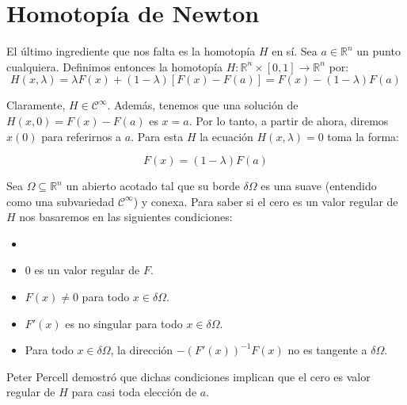 \section{Homotopía de Newton}
El último ingrediente que nos falta es la homotopía $H$ en sí. Sea $a\in\mathbb{R}^n$ un punto cualquiera. Definimos entonces la homotopía $H:\mathbb{R}^n\times [0,1] \to \mathbb{R}^n$ por:
\[ H(x,\lambda) = \lambda F(x) + (1- \lambda) [F(x)- F(a)] = F(x) - (1-\lambda) F(a) \]

Claramente, $H \in \mathcal{C}^\infty$. Además, tenemos que una solución de $H(x,0)=F(x)-F(a)$ es $x=a$. Por lo tanto, a partir de ahora, diremos $x(0)$ para referirnos a $a$.
Para esta $H$ la ecuación $H(x,\lambda)=0$ toma la forma:

\[ F(x) = (1 - \lambda) F(a) \]

Sea $\Omega \subseteq \mathbb{R}^n$ un abierto acotado tal que su borde $\delta \Omega$ es una suave (entendido como una subvariedad $\mathcal{C}^\infty$) y conexa.
Para saber si el cero es un valor regular de $H$ nos basaremos en las siguientes condiciones:

\begin{definition}
	\begin{itemize}
		\item[]
		\item $0$ es un valor regular de $F$.
		\item $F(x) \neq 0$ para todo $x\in\delta\Omega$.
		\item $F'(x)$ es no singular para todo $x\in\delta\Omega$.
		\item Para todo $x\in\delta\Omega$, la dirección $-(F'(x))^{-1}F(x)$ no es tangente a $\delta\Omega$.
	\end{itemize}
\end{definition}

Peter Percell demostró que dichas condiciones implican que el cero es valor regular de $H$ para casi toda elección de $a$. 

